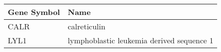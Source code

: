 \begin{tabular}{ll}
\toprule
Gene Symbol &                                      Name \\
\midrule
       CALR &                              calreticulin \\
       LYL1 & lymphoblastic leukemia derived sequence 1 \\
\bottomrule
\end{tabular}
